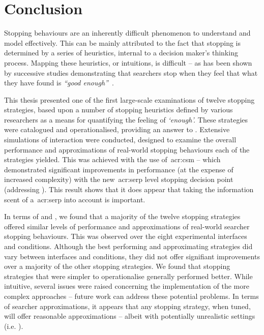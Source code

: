 \section{Conclusion}\label{sec:conclusions:conclusion}
Stopping behaviours are an inherently difficult phenomenon to understand and model effectively. This can be mainly attributed to the fact that stopping is determined by a series of heuristics, internal to a decision maker's thinking process. Mapping these heuristics, or intuitions, is difficult -- as has been shown by successive studies demonstrating that searchers stop when they feel that what they have found is \emph{``good enough''}~\citep{zach2005enough_is_enough}.

This thesis presented one of the first large-scale examinations of twelve stopping strategies, based upon a number of stopping heuristics defined by various researchers as a means for quantifying the feeling of \emph{`enough'.} These strategies were catalogued and operationalised, providing an answer to . Extensive simulations of interaction were conducted, designed to examine the overall performance and approximations of real-world stopping behaviours each of the strategies yielded. This was achieved with the use of~\gls{acr:csm} -- which demonstrated significant improvements in performance (at the expense of increased complexity) with the new~\gls{acr:serp} level stopping decision point (addressing ). This result shows that it does appear that taking the information scent of a~\gls{acr:serp} into account is important.

In terms of  and , we found that a majority of the twelve stopping strategies offered similar levels of performance and approximations of real-world searcher stopping behaviours. This was observed over the eight experimental interfaces and conditions. Although the best performing and approximating strategies did vary between interfaces and conditions, they did not offer signifiant improvements over a majority of the other stopping strategies. We found that stopping strategies that were simpler to operationalise generally performed better. While intuitive, several issues were raised concerning the implementation of the more complex approaches -- future work can address these potential problems. In terms of searcher approximations, it appears that any stopping strategy, when tuned, will offer reasonable approximations -- albeit with potentially unrealistic settings (i.e. ).

